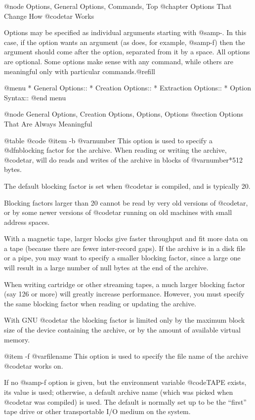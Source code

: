 @node Options, General Options, Commands, Top
@chapter Options That Change How @code{tar} Works

Options may be specified as individual arguments starting with @samp{-}.
In this case, if the option wants an argument (as does, for example,
@samp{-f}) then the argument should come after the option, separated
from it by a space.
All options are optional.  Some options make sense with any command, while
others are meaningful only with particular commands.@refill

@menu
* General Options::
* Creation Options::
* Extraction Options::
* Option Syntax::
@end menu

@node General Options, Creation Options, Options, Options
@section Options That Are Always Meaningful

@table @code
@item -b @var{number}
This option is used to specify a @dfn{blocking factor} for the
archive.  When reading or writing the archive, @code{tar}, will do
reads and writes of the archive in blocks of @var{number}*512 bytes.

The default blocking factor is set when @code{tar} is compiled, and is
typically 20.

Blocking factors larger than 20 cannot be read by very old versions of
@code{tar}, or by some newer versions of @code{tar} running on old machines
with small address spaces.

With a magnetic tape, larger blocks give faster throughput and fit
more data on a tape (because there are fewer inter-record gaps).  If
the archive is in a disk file or a pipe, you may want to specify a
smaller blocking factor, since a large one will result in a large
number of null bytes at the end of the archive.

When writing cartridge or other streaming tapes, a much larger
blocking factor (say 126 or more) will greatly increase performance.
However, you must specify the same blocking factor when reading or
updating the archive.

With GNU @code{tar} the blocking factor is limited only by the maximum
block size of the device containing the archive, or by the amount of
available virtual memory.

@item -f @var{filename}
This option is used to specify the file name of the archive @code{tar}
works on.

If no @samp{-f} option is given, but the environment variable
@code{TAPE} exists, its value is used; otherwise, a default archive
name (which was picked when @code{tar} was compiled) is used.  The
default is normally set up to be the ``first'' tape drive or other
transportable I/O medium on the system.

